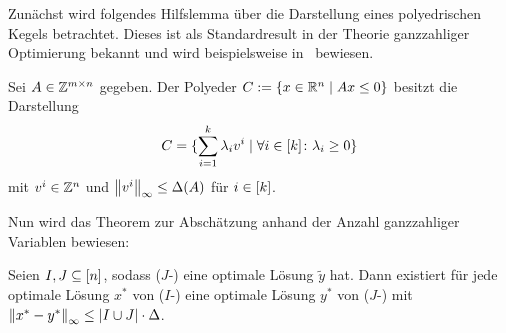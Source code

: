 Zunächst wird folgendes Hilfslemma über die Darstellung eines polyedrischen Kegels betrachtet.
Dieses ist als Standardresult in der Theorie ganzzahliger Optimierung bekannt und wird beispielsweise in~\cite[Lemma 5.4]{Korte2012} bewiesen.
\begin{lemma}\label{lem:cone}
	Sei $A\in\mathbb{Z}^{m\times n}$ gegeben.
	Der Polyeder $C:=\{ x\in\mathbb{R}^n \mid A x\leq 0 \}$ besitzt die Darstellung $$C=\{\sum_{i=1}^k\lambda_i v^i \mid \forall i\in[k] \colon\lambda_i\geq0 \}$$ mit $v^i\in\mathbb{Z}^n$ und $\left\lVert v^i\right\rVert_\infty\leq\Delta(A)$ für $i\in[k]$.
\end{lemma}

Nun wird das Theorem zur Abschätzung anhand der Anzahl ganzzahliger Variablen bewiesen:

\begin{theorem}\label{thm:theo2}
	Seien $I,J\subseteq[n]$, sodass ($J$-\MIPR) eine optimale Lösung $\tilde{y}$ hat.
	Dann existiert für jede optimale Lösung $x^*$ von ($I$-\MIPR) eine optimale Lösung $y^*$ von ($J$-\MIPR) mit $\left\lVert x^*-y^*\right\rVert_\infty\leq\lvert I\cup J \rvert\cdot\Delta$.
\end{theorem}
